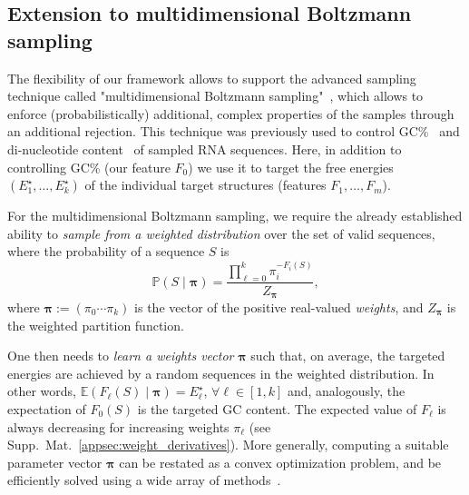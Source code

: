 \documentclass[]{bmcart}
\newcommand{\val}{\bar S} %
\newcommand{\partfun}[1]{Z_{#1}}
\newcommand{\F}{\mathcal{F}}
\newcommand{\Def}[1]{\emph{#1}}
\newcommand{\TargetE}{E^{\star}}
\newcommand{\Nuc}[1]{{\sf #1}}
\newcommand{\Cb}{\Nuc{C}}
\newcommand{\Gb}{\Nuc{G}}
\newcommand{\GCb}{\Gb\Cb}
\newcommand{\citep}[1]{\cite{#1}}
\begin{document}
\subsection*{Extension to multidimensional Boltzmann sampling}\label{sec:multiBoltzmann}
The flexibility of our framework allows to support the advanced sampling technique called "multidimensional Boltzmann sampling"~\citep{Bodini2010}, which allows to enforce (probabilistically)  additional, complex properties of the samples through an additional rejection.
This technique was previously used to control \GCb\%~\citep{Waldispuehl2011,Reinharz2013} and di-nucleotide content~\citep{Zhang2013} of sampled RNA sequences. Here, in addition to controlling \GCb\% (our feature $F_0$) we use it to target the free energies $(\TargetE_1,\ldots,\TargetE_k)$ of the individual target structures (features $F_1,\dots,F_m$).

For the multidimensional Boltzmann sampling, we require the already established ability to \Def{sample from a weighted distribution} over the set of valid sequences, where the probability of a sequence $S$ is
$$\mathbb{P}(S\mid \pmb{\pi}) = \frac{\prod_{\ell=0}^{k} \pi_i^{-F_i(S)}}{\partfun{\pmb{\pi}}},$$
where $\pmb{\pi}:=(\pi_0\cdots\pi_k)$ is the vector of the positive real-valued \Def{weights}, and $\partfun{\pmb{\pi}}$ is the weighted partition function.


One then needs to \Def{learn a weights vector} $\pmb{\pi}$ such that, on average, the targeted energies are achieved by a random sequences in the weighted distribution. In other words,  $\mathbb{E}(F_\ell(S)\mid \pmb{\pi})=\TargetE_\ell$,  $\forall\ell\in[1,k]$ and, analogously, the expectation of $F_0(S)$ is the targeted GC content.
The expected value of $F_\ell$ is always decreasing for increasing weights $\pi_\ell$ (see Supp.\ Mat.~\ref{appsec:weight_derivatives}). More generally, computing a suitable parameter vector $\pmb{\pi}$ can be restated as a convex optimization problem, and be efficiently solved using a wide array of methods~\citep{Denise2010,Bendkowski2017}.
\end{document}
